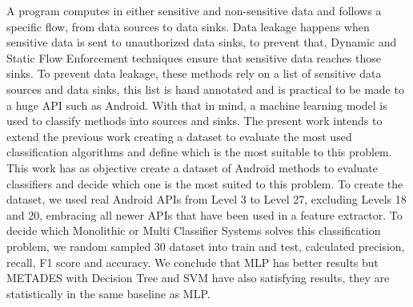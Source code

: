 A program computes in either sensitive and non-sensitive data and follows a specific flow, from data sources to data sinks. Data leakage happens when sensitive data is sent to unauthorized data sinks, to prevent that, Dynamic and Static Flow Enforcement  techniques ensure that sensitive data reaches those sinks. To prevent data leakage, these methods rely on a list of sensitive data sources and data sinks, this list is hand annotated and is practical to be made to a huge API such as Android. With that in mind, a machine learning model is used to classify methods into sources and sinks. The present work intends to extend the previous work creating a dataset to evaluate the most used classification algorithms and define which is the most suitable to this problem. \\

This work has as objective create a dataset of Android methods to evaluate classifiers and decide which one is the most suited to this problem. To create the dataset, we used real Android APIs from Level 3 to Level 27, excluding Levels 18 and 20, embracing all newer APIs that have been used in a feature extractor. To decide which Monolithic or Multi Classifier Systems solves this classification problem, we random sampled 30 dataset into train and test, calculated precision, recall, F1 score and accuracy. We conclude that MLP has better results but METADES with Decision Tree and SVM have also satisfying results, they are statistically in the same baseline as MLP.
